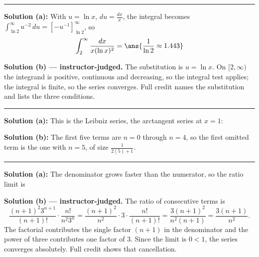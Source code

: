 \documentclass[12pt]{article}
\begin{document}
\vspace{0.2cm}\noindent\rule{\linewidth}{0.2pt}\vspace{0.2cm}


\textbf{Solution (a):} With $u = \ln x$, $du = \frac{dx}{x}$, the integral becomes $\int_{\ln 2}^{\infty} u^{-2}\,du = \left[-u^{-1}\right]_{\ln 2}^{\infty}$, so
\[ \int_2^{\infty}\frac{dx}{x(\ln x)^{2}} = \ans{\frac{1}{\ln 2} \approx 1.443} \]

\textbf{Solution (b) --- instructor-judged.} The substitution is $u = \ln x$. On $[2, \infty)$ the integrand is positive, continuous and decreasing, so the integral test applies; the integral is finite, so the series converges. Full credit names the substitution and lists the three conditions.

\vspace{0.2cm}\noindent\rule{\linewidth}{0.2pt}\vspace{0.2cm}


\textbf{Solution (a):} This is the Leibniz series, the arctangent series at $x = 1$: 

\textbf{Solution (b):} The first five terms are $n = 0$ through $n = 4$, so the first omitted term is the one with $n = 5$, of size $\frac{1}{2(5)+1}$. 

\vspace{0.2cm}\noindent\rule{\linewidth}{0.2pt}\vspace{0.2cm}


\textbf{Solution (a):} The denominator grows faster than the numerator, so the ratio limit is 

\textbf{Solution (b) --- instructor-judged.} The ratio of consecutive terms is
\[ \frac{(n+1)^{2}3^{n+1}}{(n+1)!}\cdot\frac{n!}{n^{2}3^{n}}
   = \frac{(n+1)^{2}}{n^{2}}\cdot 3 \cdot \frac{n!}{(n+1)!}
   = \frac{3(n+1)^{2}}{n^{2}(n+1)} = \frac{3(n+1)}{n^{2}}. \]
The factorial contributes the single factor $(n+1)$ in the denominator and the power of three contributes one factor of $3$. Since the limit is $0 < 1$, the series converges absolutely. Full credit shows that cancellation.
\end{document}
